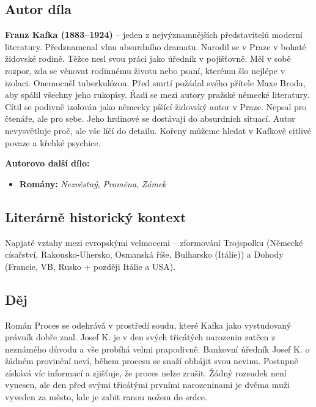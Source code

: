\documentclass[12pt, a4paper]{article}
\begin{document}
\subsection*{Autor díla}
\textbf{Franz Kafka (1883--1924)} -- jeden z nejvýznamnějších představitelů moderní literatury. Předznamenal vlnu absurdního dramatu. Narodil se v Praze v bohaté židovské rodině. Těžce nesl svou práci jako úředník v pojišťovně. Měl v sobě rozpor, zda se věnovat rodinnému životu nebo psaní, kterému šlo nejlépe v izolaci. Onemocněl tuberkulózou. Před smrtí požádal svého přítele Maxe Broda, aby spálil všechny jeho rukopisy. Řadí se mezi autory pražské německé literatury. Cítil se podivně izolován jako německy píšící židovský autor v Praze. Nepsal pro čtenáře, ale pro sebe. Jeho hrdinové se dostávají do absurdních situací. Autor nevysvětluje proč, ale vše líčí do detailu. Kořeny můžeme hledat v Kafkově citlivé povaze a křehké psychice.

\textbf{Autorovo další dílo:}
\begin{itemize}[itemsep=0.3em]
	\item \textbf{Romány:} \textit{Nezvěstný}, \textit{Proměna}, \textit{Zámek}
\end{itemize}

\subsection*{Literárně historický kontext}
Napjaté vztahy mezi evropskými velmocemi -- zformování Trojspolku (Německé císařství, Rakousko-Uhersko, Osmanská říše, Bulharsko (Itálie)) a Dohody (Francie, VB, Rusko + později Itálie a USA).

	{\color{subsectioncolor}\hrulefill}
\subsection*{\color{subsectioncolor}Děj}
Román Proces se odehrává v prostředí soudu, které Kafka jako vystudovaný právník dobře znal. Josef K. je v den svých třicátých narozenin zatčen z neznámého důvodu a vše probíhá velmi prapodivně. Bankovní úředník Josef K. o žádném provinění neví, během procesu se snaží obhájit svou nevinu. Postupně získává víc informací a zjišťuje, že proces nelze zrušit. Žádný rozsudek není vynesen, ale den před svými třicátými prvními narozeninami je dvěma muži vyveden za město, kde je zabit ranou nožem do srdce.

\newpage

\end{document}
